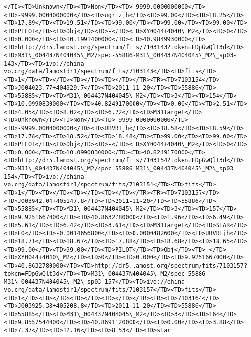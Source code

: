 \documentclass[11pt]{article}
\begin{document}
\begin{Verbatim}[commandchars=\\\{\}]
</TD><TD>Unknown</TD><TD>Non</TD><TD>-9999.0000000000</TD><TD>-9999.0000000000</TD><TD>ugrizjh</TD><TD>99.00</TD><TD>18.25</TD><TD>17.89</TD><TD>19.51</TD><TD>99.00</TD><TD>99.00</TD><TD>99.00</TD><TD>PILOT</TD><TD>Obj</TD><TD>-</TD><TD>XY0044+4040\_M2</TD><TD>0</TD><TD>0.000</TD><TD>10.1991400000</TD><TD>40.9849930000</TD><TD>http://dr5.lamost.org/spectrum/fits/7103143?token=FDpGwQlt3d</TD><TD>M31\_004437N404045\_M2/spec-55886-M31\_004437N404045\_M2\_sp03-143</TD><TD>ivo://china-vo.org/data/lamostdr1/spectrum/fits/7103143</TD><TD>fits</TD><TD>1</TD><TD></TD><TD></TD><TD></TD></TR><TR><TD>7103154</TD><TD>J004023.77+404929.7</TD><TD>2011-11-20</TD><TD>55886</TD><TD>55885</TD><TD>M31\_004437N404045\_M2</TD><TD>3</TD><TD>154</TD><TD>10.0990830000</TD><TD>40.8249170000</TD><TD>0.00</TD><TD>2.51</TD><TD>4.05</TD><TD>8.02</TD><TD>6.22</TD><TD>M31target</TD><TD>Unknown</TD><TD>Non</TD><TD>-9999.0000000000</TD><TD>-9999.0000000000</TD><TD>UBVRIjh</TD><TD>18.58</TD><TD>18.59</TD><TD>17.78</TD><TD>18.52</TD><TD>18.48</TD><TD>99.00</TD><TD>99.00</TD><TD>PILOT</TD><TD>Obj</TD><TD>-</TD><TD>XY0044+4040\_M2</TD><TD>0</TD><TD>0.000</TD><TD>10.0990830000</TD><TD>40.8249170000</TD><TD>http://dr5.lamost.org/spectrum/fits/7103154?token=FDpGwQlt3d</TD><TD>M31\_004437N404045\_M2/spec-55886-M31\_004437N404045\_M2\_sp03-154</TD><TD>ivo://china-vo.org/data/lamostdr1/spectrum/fits/7103154</TD><TD>fits</TD><TD>1</TD><TD></TD><TD></TD><TD></TD></TR><TR><TD>7103157</TD><TD>J003942.04+405147.8</TD><TD>2011-11-20</TD><TD>55886</TD><TD>55885</TD><TD>M31\_004437N404045\_M2</TD><TD>3</TD><TD>157</TD><TD>9.9251667000</TD><TD>40.8632780000</TD><TD>1.96</TD><TD>6.49</TD><TD>5.61</TD><TD>6.42</TD><TD>3.61</TD><TD>M31target</TD><TD>STAR</TD><TD>F0</TD><TD>-0.0014656800</TD><TD>0.0000482600</TD><TD>UBVRIjh</TD><TD>18.71</TD><TD>18.67</TD><TD>17.88</TD><TD>18.68</TD><TD>18.65</TD><TD>99.00</TD><TD>99.00</TD><TD>PILOT</TD><TD>Obj</TD><TD>-</TD><TD>XY0044+4040\_M2</TD><TD>0</TD><TD>0.000</TD><TD>9.9251667000</TD><TD>40.8632780000</TD><TD>http://dr5.lamost.org/spectrum/fits/7103157?token=FDpGwQlt3d</TD><TD>M31\_004437N404045\_M2/spec-55886-M31\_004437N404045\_M2\_sp03-157</TD><TD>ivo://china-vo.org/data/lamostdr1/spectrum/fits/7103157</TD><TD>fits</TD><TD>1</TD><TD></TD><TD></TD><TD></TD></TR><TR><TD>7103164</TD><TD>J003925.38+405208.8</TD><TD>2011-11-20</TD><TD>55886</TD><TD>55885</TD><TD>M31\_004437N404045\_M2</TD><TD>3</TD><TD>164</TD><TD>9.8557544000</TD><TD>40.8691120000</TD><TD>0.00</TD><TD>3.88</TD><TD>7.37</TD><TD>12.16</TD><TD>8.53</TD><TD>star     
\end{Verbatim}
\end{document}
